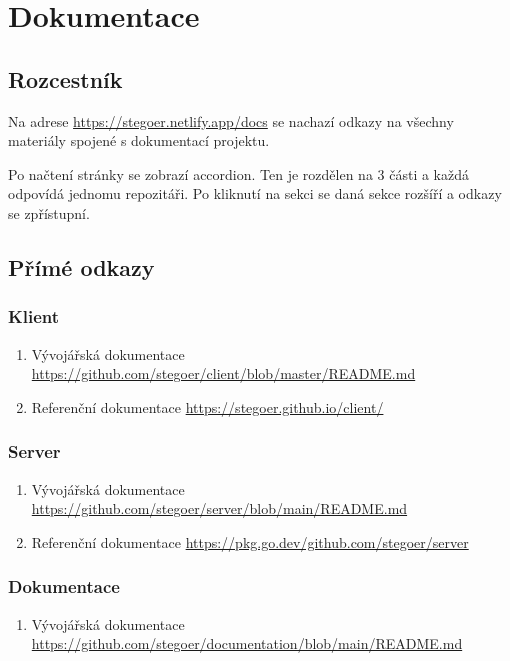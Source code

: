 
\section{Dokumentace}\label{sec:dokumentace}

\subsection{Rozcestník}\label{subsec:rozcestnik}
Na adrese \url{https://stegoer.netlify.app/docs} se nachazí odkazy na všechny
materiály spojené s dokumentací projektu.

Po načtení stránky se zobrazí accordion\cite{enwiki:accordion}.
Ten je rozdělen na 3 části a každá odpovídá jednomu repozitáři.
Po kliknutí na sekci se daná sekce rozšíří a odkazy se zpřístupní.

\subsection{Přímé odkazy}\label{subsec:online}

\subsubsection{Klient}\label{subsubsec:doc-klient}

\begin{enumerate}
    \item Vývojářská dokumentace \url{https://github.com/stegoer/client/blob/master/README.md}
    \item Referenční dokumentace \url{https://stegoer.github.io/client/}
\end{enumerate}

\subsubsection{Server}\label{subsubsec:doc-server}
\begin{enumerate}
    \item Vývojářská dokumentace \url{https://github.com/stegoer/server/blob/main/README.md}
    \item Referenční dokumentace \url{https://pkg.go.dev/github.com/stegoer/server}
\end{enumerate}

\subsubsection{Dokumentace}\label{subsubsec:doc-dokumentace}
\begin{enumerate}
    \item Vývojářská dokumentace \url{https://github.com/stegoer/documentation/blob/main/README.md}
\end{enumerate}

